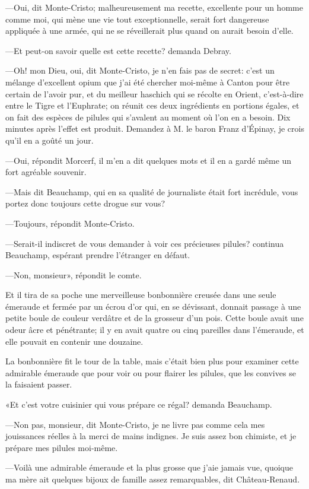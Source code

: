 —Oui, dit Monte-Cristo; malheureusement ma recette, excellente pour un homme comme moi, qui mène une vie tout exceptionnelle, serait fort dangereuse appliquée à une armée, qui ne se réveillerait plus quand on aurait besoin d'elle. 

—Et peut-on savoir quelle est cette recette? demanda Debray. 

—Oh! mon Dieu, oui, dit Monte-Cristo, je n'en fais pas de secret: c'est un mélange d'excellent opium que j'ai été chercher moi-même à Canton pour être certain de l'avoir pur, et du meilleur haschich qui se récolte en Orient, c'est-à-dire entre le Tigre et l'Euphrate; on réunit ces deux ingrédients en portions égales, et on fait des espèces de pilules qui s'avalent au moment où l'on en a besoin. Dix minutes après l'effet est produit. Demandez à M. le baron Franz d'Épinay, je crois qu'il en a goûté un jour. 

—Oui, répondit Morcerf, il m'en a dit quelques mots et il en a gardé même un fort agréable souvenir. 

—Mais dit Beauchamp, qui en sa qualité de journaliste était fort incrédule, vous portez donc toujours cette drogue sur vous?  

—Toujours, répondit Monte-Cristo. 

—Serait-il indiscret de vous demander à voir ces précieuses pilules? continua Beauchamp, espérant prendre l'étranger en défaut. 

—Non, monsieur», répondit le comte. 

Et il tira de sa poche une merveilleuse bonbonnière creusée dans une seule émeraude et fermée par un écrou d'or qui, en se dévissant, donnait passage à une petite boule de couleur verdâtre et de la grosseur d'un pois. Cette boule avait une odeur âcre et pénétrante; il y en avait quatre ou cinq pareilles dans l'émeraude, et elle pouvait en contenir une douzaine.  

La bonbonnière fit le tour de la table, mais c'était bien plus pour examiner cette admirable émeraude que pour voir ou pour flairer les pilules, que les convives se la faisaient passer. 

«Et c'est votre cuisinier qui vous prépare ce régal? demanda Beauchamp. 

—Non pas, monsieur, dit Monte-Cristo, je ne livre pas comme cela mes jouissances réelles à la merci de mains indignes. Je suis assez bon chimiste, et je prépare mes pilules moi-même. 

—Voilà une admirable émeraude et la plus grosse que j'aie jamais vue, quoique ma mère ait quelques bijoux de famille assez remarquables, dit Château-Renaud. 

